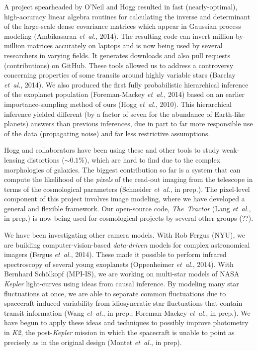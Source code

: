 \documentclass[12pt]{article}
\newcommand{\foreign}[1]{\textsl{#1}}
\newcommand{\etal}{\foreign{et~al.}}
\newcommand{\project}[1]{\textsl{#1}}
\begin{document}
A project spearheaded by O'Neil and Hogg resulted in
fast (nearly-optimal), high-accuracy linear algebra
routines for calculating the inverse and determinant of the large-scale
dense covariance matrices which appear in Gaussian process modeling
(Ambikasaran \etal, 2014).
The resulting code can invert million-by-million matrices
accurately on laptops and is now being used by
several researchers in varying fields.
It generates downloads and also pull requests (contributions) 
on GitHub.
These tools allowed us to address a controversy concerning properties 
of some transits around highly variable stars (Barclay \etal, 2014).
We also produced the first fully probabilistic hierarchical inference of
the exoplanet population (Foreman-Mackey \etal, 2014) based on an
earlier importance-sampling method of ours (Hogg \etal, 2010).
This hierarchical inference yielded different (by a factor of seven for
the abundance of Earth-like planets) answers than previous inferences,
due in part to far more responsible use of the data (propagating noise)
and far less restrictive assumptions.

Hogg and collaborators have been using these and other tools to study
weak-lensing distortions ($\sim 0.1\%$), which are hard to find
due to the complex morphologies of galaxies.
The biggest contribution so far is a system
that can compute the likelihood of the \emph{pixels} of the read-out
imaging from the telescope in terms of the cosmological parameters
(Schneider \etal, in prep.).
The pixel-level component of this project involves image modeling,
where we have developed a general and flexible framework.
Our open-source code, \project{The~Tractor} (Lang \etal,
in prep.) is now being used for cosmological projects by several other groups (??).

We have been investigating other camera models.
With Rob Fergus (NYU), we are building
computer-vision-based \emph{data-driven} models for complex astronomical 
imagers (Fergus \etal, 2014).
These made it possible to perform infrared spectroscopy of several 
young exoplanets (Oppenheimer \etal, 2014).
With Bernhard Sch\"olkopf (MPI-IS), we are working on multi-star models
of NASA \project{Kepler} light-curves using ideas from
causal inference. 
By modeling many star fluctuations at once, we are able to separate
common fluctuations due to spacecraft-induced variability from idiosyncratic
star fluctuations that contain transit information (Wang \etal, in prep.;
Foreman-Mackey \etal, in prep.).
We have begun to apply these ideas and techniques to 
possibly improve photometry in \project{K2}, the
post-\project{Kepler} mission in which the spacecraft is unable to point
as precisely as in the original design (Montet \etal, in prep).
\end{document}
